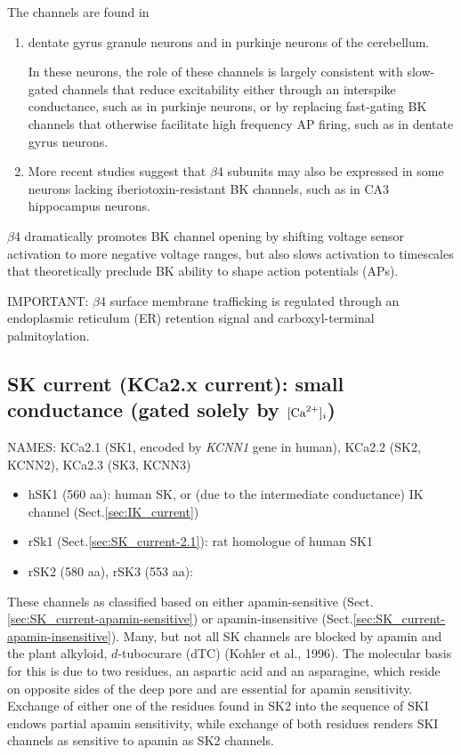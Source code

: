 The channels are found in  \citep{wang2014}
\begin{enumerate}
  \item dentate gyrus granule neurons and in purkinje neurons of the cerebellum.

In these neurons, the role of these channels is largely consistent with
slow-gated channels that reduce excitability either through an interspike
conductance, such as in purkinje neurons, or by replacing fast-gating BK
channels that otherwise facilitate high frequency AP firing, such as in dentate
gyrus neurons. 

  \item More recent studies suggest that $\beta$4 subunits may also be
  expressed in some neurons lacking iberiotoxin-resistant BK channels, such as
 in CA3 hippocampus neurons.
\end{enumerate}

$\beta$4 dramatically promotes BK channel opening by shifting voltage sensor
activation to more negative voltage ranges, but also slows activation to
timescales that theoretically preclude BK ability to shape action potentials
(APs).

IMPORTANT: $\beta$4 surface membrane trafficking is regulated through an
endoplasmic reticulum (ER) retention signal and carboxyl-terminal
palmitoylation.

\subsection{SK current (KCa2.x current): small conductance (gated solely by
$[{\text{Ca}^{2+}}]_i$)}
\label{sec:SK_current}

NAMES: KCa2.1 (SK1, encoded by {\it KCNN1} gene in human), KCa2.2 (SK2, KCNN2),
KCa2.3 (SK3, KCNN3)
\begin{itemize}
  \item hSK1 (560 aa): human SK, or (due to the intermediate conductance) IK
  channel (Sect.\ref{sec:IK_current})

  \item rSk1 (Sect.\ref{sec:SK_current-2.1}): rat homologue of human SK1

  \item rSK2 (580 aa), rSK3 (553 aa):

\end{itemize}
These channels as classified based on either apamin-sensitive
(Sect.\ref{sec:SK_current-apamin-sensitive}) or apamin-insensitive
(Sect.\ref{sec:SK_current-apamin-insensitive}).
Many, but not all SK channels are blocked by apamin and the plant alkyloid,
$d$-tubocurare (dTC) (Kohler et al., 1996).
The molecular basis for this is due to two residues, an aspartic acid and an
asparagine, which reside on opposite sides of the deep pore and are essential
for apamin sensitivity.
Exchange of either one of the residues found in SK2 into the sequence of SKI
endows partial apamin sensitivity, while exchange of both residues renders SKI
channels as sensitive to apamin as SK2 channels.


